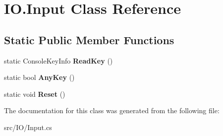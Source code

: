 \hypertarget{class_i_o_1_1_input}{}\section{I\+O.\+Input Class Reference}
\label{class_i_o_1_1_input}
\subsection*{Static Public Member Functions}
\begin{DoxyCompactItemize}
\item 
\mbox{\label{class_i_o_1_1_input_a68bf573955c7c1159fd3ccacd6edc921}} 
static Console\+Key\+Info {\bfseries Read\+Key} ()
\item 
\mbox{\label{class_i_o_1_1_input_adb31cb049fb35e721a26c96172c8da72}} 
static bool {\bfseries Any\+Key} ()
\item 
\mbox{\label{class_i_o_1_1_input_a5e6c5e82708cc1f2a0a7b31897660fff}} 
static void {\bfseries Reset} ()
\end{DoxyCompactItemize}


The documentation for this class was generated from the following file\+:\begin{DoxyCompactItemize}
\item 
src/\+I\+O/Input.\+cs\end{DoxyCompactItemize}
